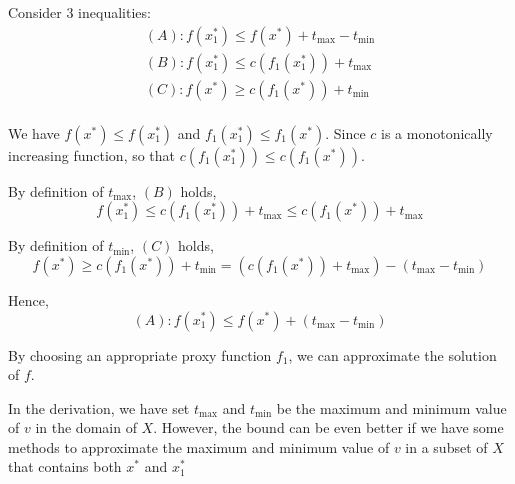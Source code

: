 \documentclass{article}
\begin{document}
    Consider 3 inequalities:
    \begin{gather*}
    (A)
        : f(x^*_1) \leq f(x^*) + t_{\max} - t_{\min}\\
        (B): f(x^*_1) \leq c(f_1(x^*_1)) + t_{\max}\\
        (C): f(x^*) \geq c(f_1(x^*)) + t_{\min}\\
    \end{gather*}

    We have $f(x^*) \leq f(x^*_1)$ and $f_1(x^*_1) \leq f_1(x^*)$.
    Since $c$ is a monotonically increasing function, so that $c(f_1(x^*_1)) \leq c(f_1(x^*))$.


    By definition of $t_{\max}$, $(B)$ holds,
    \[
        f(x^*_1) \leq c(f_1(x^*_1)) + t_{\max} \leq c(f_1(x^*)) + t_{\max}
    \]

    By definition of $t_{\min}$, $(C)$ holds,
    \[
        f(x^*) \geq c(f_1(x^*)) + t_{\min} = (c(f_1(x^*)) + t_{\max}) - (t_{\max} - t_{\min})
    \]

    Hence,
    \[
        (A): f(x^*_1) \leq f(x^*) + (t_{\max} - t_{\min})
    \]

    By choosing an appropriate proxy function $f_1$, we can approximate the solution of $f$.

    In the derivation, we have set $t_{\max}$ and $t_{\min}$ be the maximum and minimum value of $v$ in the domain of $X$.
    However, the bound can be even better if we have some methods to approximate the maximum and minimum value of $v$ in a subset of $X$ that contains both $x^*$ and $x^*_1$
    
\end{document}
